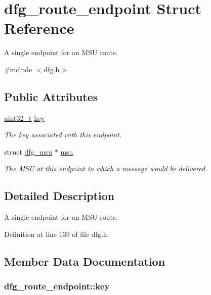 \hypertarget{structdfg__route__endpoint}{\section{dfg\-\_\-route\-\_\-endpoint Struct Reference}
\label{structdfg__route__endpoint}
}


A single endpoint for an M\-S\-U route.  




{\ttfamily \#include $<$dfg.\-h$>$}

\subsection*{Public Attributes}
\begin{DoxyCompactItemize}
\item 
\hyperlink{msus_2webserver_2uthash_8h_a435d1572bf3f880d55459d9805097f62}{uint32\-\_\-t} \hyperlink{structdfg__route__endpoint_acff408d5be032f79f7927abf4568b8ea}{key}
\begin{DoxyCompactList}\small\item\em The key associated with this endpoint. \end{DoxyCompactList}\item 
struct \hyperlink{structdfg__msu}{dfg\-\_\-msu} $\ast$ \hyperlink{structdfg__route__endpoint_aa05dabbb8629dbf8d032ef0d4f304e4d}{msu}
\begin{DoxyCompactList}\small\item\em The M\-S\-U at this endpoint to which a message would be delivered. \end{DoxyCompactList}\end{DoxyCompactItemize}


\subsection{Detailed Description}
A single endpoint for an M\-S\-U route. 

Definition at line 139 of file dfg.\-h.



\subsection{Member Data Documentation}
\hypertarget{structdfg__route__endpoint_acff408d5be032f79f7927abf4568b8ea}{
\subsubsection[{key}]{ dfg\-\_\-route\-\_\-endpoint\-::key}}\label{structdfg__route__endpoint_acff408d5be032f79f7927abf4568b8ea}


